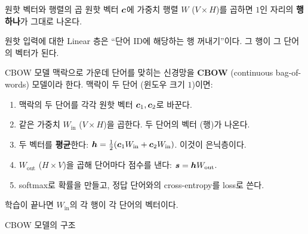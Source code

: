\documentclass[aspectratio=169,11pt]{beamer}
\begin{document}
\begin{frame}{원핫 벡터와 행렬의 곱}
원핫 벡터 $\bm{c}$에 가중치 행렬 $W$ ($V\times H$)를 곱하면 $1$인 자리의 \textbf{행 하나}가 그대로 나온다.
\vskip1mm
\begin{keybox}
원핫 입력에 대한 Linear 층은 ``단어 ID에 해당하는 행 꺼내기''이다. 그 행이 그 단어의 벡터가 된다.
\end{keybox}
\end{frame}

\begin{frame}{CBOW 모델}
맥락으로 가운데 단어를 맞히는 신경망을 \textbf{CBOW} (continuous bag-of-words) 모델이라 한다.
맥락이 두 단어 (윈도우 크기 $1$)이면:
\vskip1mm
\begin{enumerate}
\item 맥락의 두 단어를 각각 원핫 벡터 $\bm{c}_1,\bm{c}_2$로 바꾼다.
\item 같은 가중치 $W_{\text{in}}$ ($V\times H$)을 곱한다. 두 단어의 벡터 (행)가 나온다.
\item 두 벡터를 \textbf{평균}한다:
$\bm{h}=\tfrac12(\bm{c}_1W_{\text{in}}+\bm{c}_2W_{\text{in}})$. 이것이 은닉층이다.
\item $W_{\text{out}}$ ($H\times V$)을 곱해 단어마다 점수를 낸다: $\bm{s}=\bm{h}W_{\text{out}}$.
\item softmax로 확률을 만들고, 정답 단어와의 cross-entropy를 loss로 쓴다.
\end{enumerate}
\vskip1mm
학습이 끝나면 $W_{\text{in}}$의 각 행이 각 단어의 벡터이다.
\end{frame}

\begin{frame}{CBOW 모델의 구조}
\end{frame}
\end{document}
